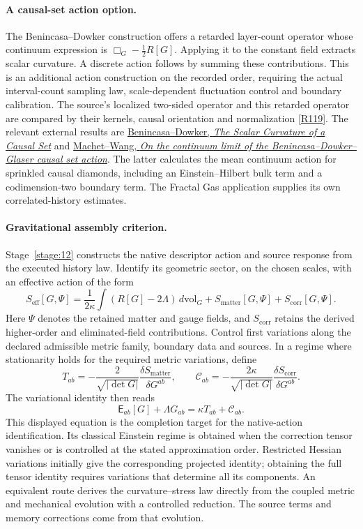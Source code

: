 \documentclass[11pt,a4paper]{article}
\begin{document}
\paragraph{A causal-set action option.}
The Benincasa--Dowker construction offers a retarded layer-count operator
whose continuum expression is $\Box_G-\tfrac12R[G]$. Applying it to the
constant field extracts scalar curvature. A discrete action follows by
summing these contributions. This is an additional action construction on
the recorded order, requiring the actual interval-count sampling law,
scale-dependent fluctuation control and boundary calibration.
The source's localized two-sided operator and this retarded operator are
compared by their kernels, causal orientation and normalization
\hyperref[src:rem-cst-bd-comparison]{[R119]}.
The relevant external results are
\href{https://arxiv.org/abs/1001.2725}{Benincasa--Dowker, \emph{The Scalar Curvature of a Causal Set}}
and
\href{https://arxiv.org/abs/2007.13192}{Machet--Wang, \emph{On the continuum limit of the Benincasa--Dowker--Glaser causal set action}}.
The latter calculates the mean continuum action for sprinkled causal diamonds,
including an Einstein--Hilbert bulk term and a codimension-two boundary term.
The Fractal Gas application supplies its own correlated-history estimates.

\paragraph{Gravitational assembly criterion.}
Stage~\ref{stage:12} constructs the native descriptor action and source
response from the executed history law. Identify its geometric sector, on the
chosen scales, with an effective action of the form
\[
S_{\mathrm{eff}}[G,\Psi]
 =\frac1{2\kappa}\int(R[G]-2\Lambda)\,d\mathrm{vol}_G
 +S_{\mathrm{matter}}[G,\Psi]+S_{\mathrm{corr}}[G,\Psi].
\]
Here $\Psi$ denotes the retained matter and gauge fields, and
$S_{\mathrm{corr}}$ retains the derived higher-order and eliminated-field
contributions. Control first variations along the declared admissible metric
family, boundary data and sources. In a regime where stationarity holds for
the required metric variations, define
\[
T_{ab}=-\frac{2}{\sqrt{|\det G|}}
 \frac{\delta S_{\mathrm{matter}}}{\delta G^{ab}},\qquad
\mathcal C_{ab}=-\frac{2\kappa}{\sqrt{|\det G|}}
 \frac{\delta S_{\mathrm{corr}}}{\delta G^{ab}}.
\]
The variational identity then reads
\[
\mathsf E_{ab}[G]+\Lambda G_{ab}=\kappa T_{ab}+\mathcal C_{ab}.
\]
This displayed equation is the completion target for the native-action
identification. Its classical Einstein regime is obtained when the correction
tensor vanishes or is controlled at the stated approximation order.
Restricted Hessian variations initially give the corresponding projected
identity; obtaining the full tensor identity requires variations that determine
all its components. An equivalent route derives the curvature--stress law
directly from the coupled metric and mechanical evolution with a controlled
reduction. The source terms and memory corrections come from that evolution.
\end{document}
